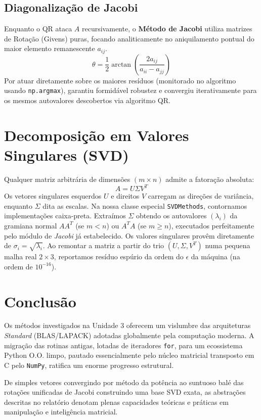 \documentclass[12pt,a4paper]{article}
\begin{document}
\subsection{Diagonalização de Jacobi}
Enquanto o QR ataca $A$ recursivamente, o \textbf{Método de Jacobi} utiliza matrizes de Rotação (Givens) puras, focando analiticamente no aniquilamento pontual do maior elemento remanescente $a_{ij}$. 
\begin{equation}
\theta = \frac{1}{2}\arctan\left(\frac{2a_{ij}}{a_{ii}-a_{jj}}\right)
\end{equation}
Por atuar diretamente sobre os maiores resíduos (monitorado no algoritmo usando \texttt{np.argmax}), garantiu formidável robustez e convergiu iterativamente para os mesmos autovalores descobertos via algoritmo QR.

\section{Decomposição em Valores Singulares (SVD)}
Qualquer matriz arbitrária de dimensões $(m \times n)$ admite a fatoração absoluta:
\begin{equation}
A = U \Sigma V^T
\end{equation}
Os vetores singulares esquerdos $U$ e direitos $V$ carregam as direções de variância, enquanto $\Sigma$ dita as escalas.
Na nossa classe especial \texttt{SVDMethods}, contornamos implementações caixa-preta.
Extraímos $\Sigma$ obtendo os autovalores $(\lambda_i)$ da gramiana normal $A A^T$ (se $m<n$) ou $A^T A$ (se $m \ge n$), executados perfeitamente pelo módulo de \textit{Jacobi} já estabelecido.
Os valores singulares provêm diretamente de $\sigma_i = \sqrt{\lambda_i}$. Ao remontar a matriz a partir do trio $(U, \Sigma, V^T)$ numa pequena malha real $2 \times 3$, reportamos resíduo espúrio da ordem do $\epsilon$ da máquina (na ordem de $10^{-16}$).

\section{Conclusão}
Os métodos investigados na Unidade 3 oferecem um vislumbre das arquiteturas \textit{Standard} (BLAS/LAPACK) adotadas globalmente pela computação moderna. A migração das rotinas antigas, lotadas de iteradores \texttt{for}, para um ecossistema Python O.O. limpo, pautado essencialmente pelo núcleo matricial transposto em C pelo \texttt{NumPy}, ratifica um enorme progresso estrutural.

De simples vetores convergindo por método da potência ao suntuoso balé das rotações unificadas de Jacobi construindo uma base SVD exata, as abstrações descritas no relatório denotam plenas capacidades teóricas e práticas em manipulação e inteligência matricial.
\end{document}
